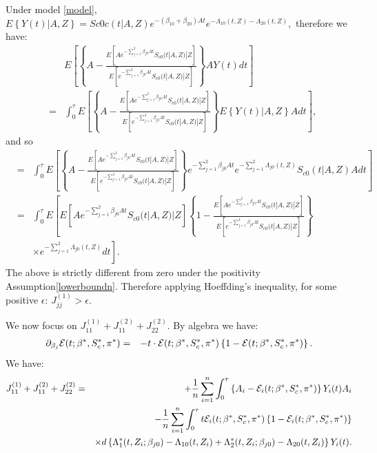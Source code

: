 \documentclass[11pt]{article}
\newcommand{\eqnn}{\begin{eqnarray*}}
\newcommand{\een}{\end{eqnarray*}}
\begin{document}
Under model \eqref{model},
$
E\left\{\left.Y(t)\right| A,Z\right\}=S{c0}c(t | A,Z)e^{-(\beta_{10}+\beta_{20})At}e^{-\Lambda_{10}(t,Z)-\Lambda_{20}(t,Z)},
$ therefore we have:
\eqnn
&&E\left[\left\{A-\frac{E\left[A e^{-\sum_{j=1}^2\beta_{j0}At}S_{c0}(t | A,Z) | Z \right]}{E\left[e^{-\sum_{j=1}^2\beta_{j0}At}S_{c0}(t | A,Z ) | Z\right]}\right\}AY(t)dt\right]\\
&=&\int_0^\tau E \left[\left\{A-\frac{E\left[A e^{-\sum_{j=1}^2\beta_{j0}At}S_{c0}(t | A,Z) | Z \right]}{E\left[e^{-\sum_{j=1}^2\beta_{j0}At}S_{c0}(t | A,Z ) | Z\right]}\right\}E\left\{Y(t)|A,Z\right\}A dt\right],
\een
and so
\eqnn
&=&\int_0^\tau E \left[\left\{A-\frac{E\left[A e^{-\sum_{j=1}^2\beta_{j0}At}S_{c0}(t | A,Z) | Z \right]}{E\left[e^{-\sum_{j=1}^2\beta_{j0}At}S_{c0}(t | A,Z ) | Z\right]}\right\}e^{-\sum_{j=1}^2\beta_{j0}At}e^{-\sum_{j=1}^2\Lambda_{j0}(t,Z)}S_{c0}(t | A, Z)Adt\right]\nonumber\\
&=&\int_0^\tau E \left[E\left[A e^{-\sum_{j=1}^2\beta_{j0}At}S_{c0}(t | A,Z) | Z \right]\left\{1-\frac{E\left[A e^{-\sum_{j=1}^2\beta_{j0}At}S_{c0}(t | A,Z) | Z \right]}{E\left[e^{-\sum_{j=1}^2\beta_{j0}At}S_{c0}(t | A,Z ) | Z\right]}\right\}\nonumber\right.\\
&&\left.\times e^{-\sum_{j=1}^2\Lambda_{j0}(t,Z)}dt\right].\nonumber
\een
The above is strictly different from zero under the positivity Assumption\ref{lowerboundn}.
Therefore applying Hoeffding's inequality, for some positive $\epsilon$:
$
J^{(1)}_{jj}>\epsilon.
$

We now focus on $J^{(1)}_{11}+J^{(2)}_{11}+J^{(2)}_{22}$.
By algebra we have:
\eqnn
\partial_{\beta_j}{\cal E}(t; {\beta}^{*}, S^{*}_c,\pi^{*} )&=&-t \cdot {\cal E}(t; {\beta}^{*}, S^{*}_c,\pi^{*} )\left\{1-{\cal E}(t; {\beta}^{*}, S^{*}_c,\pi^{*} )\right\}.
\een We have:
\eqnn
J^{(1)}_{11}+J^{(2)}_{11}+J^{(2)}_{22}&=&+\frac{1}{n}\sum_{i=1}^n\int_0^\tau  \left\{A_i-{\cal E}_i(t; {\beta}^{*}, S^{*}_c,\pi^{*})\right\}Y_i(t)A_i\\
&&-\frac{1}{n}\sum_{i=1}^n\int_0^\tau t{\cal E}_i(t; {\beta}^{*}, S^{*}_c,\pi^{*})\left\{1-{\cal E}_i(t; {\beta}^{*}, S^{*}_c,\pi^{*})\right\}\\&&\times d\left\{\Lambda_1^{*}(t,Z_i ; \beta_{j0})-\Lambda_{10}(t,Z_i)+\Lambda_2^{*}(t,Z_i ; \beta_{j0})-\Lambda_{20}(t,Z_i)\right\}Y_i(t).
\een
\end{document}
